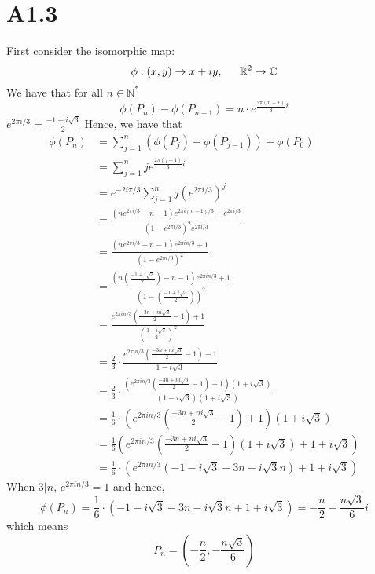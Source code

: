 \documentclass[11pt]{article}
\begin{document}
\section*{A1.3}
First consider the isomorphic map:
\[
    \phi: (x,y) \to x+iy, \indent \mathbb{R}^2 \to \mathbb{C}    
\]
We have that for all $n \in \mathbb{N}^*$
\[
    \phi(P_n) - \phi(P_{n-1}) = n \cdot e^{\frac{2\pi(n-1)}{3}i} 
\]
$e^{2\pi i/3} = \frac{-1+i\sqrt{3}}{2}$
Hence, we have that 
\begin{equation*}
    \begin{aligned}
        \phi(P_n) &= \sum_{j=1}^n (\phi(P_j) - \phi(P_{j-1})) + \phi(P_0) \\
        &= \sum_{j=1}^n j e^{\frac{2\pi(j-1)}{3}i} \\
        &= e^{-2i\pi/3}\sum_{j=1}^n j\left(e^{2\pi i/3}\right)^j \\
        &= \frac{(ne^{2\pi i/3}-n-1)e^{2\pi i(n+1)/3}+e^{2\pi i/3}}{(1-e^{2\pi i/3})^2 e^{2\pi i/3}} \\
        &= \frac{(ne^{2\pi i/3}-n-1)e^{2\pi in/3} + 1}{(1-e^{2\pi i/3})^2} \\
        &= \frac{(n\left(\frac{-1+i\sqrt{3}}{2}\right)-n-1)e^{2\pi in/3}+1 }{(1-\left(\frac{-1+i\sqrt{3}}{2}\right))^2 } \\
        &= \frac{e^{2\pi in/3} \left(\frac{-3n + ni\sqrt{3}}{2} -1\right) + 1}{\left(\frac{3 - i\sqrt{3}}{2} \right)^2} \\
        &= \frac{2}{3} \cdot \frac{e^{2\pi in/3} \left(\frac{-3n + ni\sqrt{3}}{2} -1\right) + 1}{1 - i\sqrt{3}} \\ 
        &= \frac{2}{3} \cdot \frac{\left(e^{2\pi in/3} \left(\frac{-3n + ni\sqrt{3}}{2} -1\right) + 1 \right) (1+i\sqrt{3})}{(1 - i\sqrt{3})(1+i\sqrt{3})} \\
        &= \frac{1}{6} \cdot  \left(e^{2\pi in/3} \left(\frac{-3n + ni\sqrt{3}}{2} -1\right) + 1 \right) (1+i\sqrt{3}) \\
        &= \frac{1}{6} \left(  e^{2\pi in/3} \left(\frac{-3n + ni\sqrt{3}}{2} -1\right) (1+i\sqrt{3}) + 1 + i\sqrt{3} \right) \\
        &= \frac{1}{6} \cdot (e^{2\pi in/3} (-1 - i\sqrt{3} - 3 n - i\sqrt{3} n) + 1 + i\sqrt{3})
    \end{aligned}
\end{equation*}
When $3|n$, $e^{2\pi in/3} = 1$ and hence, 
\[
    \phi(P_n) = \frac{1}{6} \cdot (-1 - i\sqrt{3} - 3 n - i\sqrt{3} n + 1 + i\sqrt{3}) = -\frac{n}{2} - \frac{n\sqrt{3}}{6}i
\]
which means 
\[
    P_n = \left(-\frac{n}{2},- \frac{n\sqrt{3}}{6}\right)
\]
\end{document}
